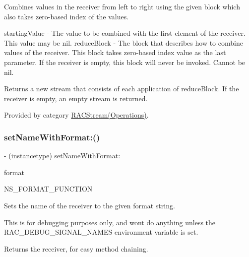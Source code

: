 Combines values in the receiver from left to right using the given block which also takes zero-\/based index of the values.

starting\+Value -\/ The value to be combined with the first element of the receiver. This value may be {\ttfamily nil}. reduce\+Block -\/ The block that describes how to combine values of the receiver. This block takes zero-\/based index value as the last parameter. If the receiver is empty, this block will never be invoked. Cannot be nil.

Returns a new stream that consists of each application of {\ttfamily reduce\+Block}. If the receiver is empty, an empty stream is returned. 

Provided by category \mbox{\hyperlink{category_r_a_c_stream_07_operations_08_a69cedeb6e96a6d4154f2256fdcbe27b1}{R\+A\+C\+Stream(\+Operations)}}.

\mbox{\label{interface_r_a_c_stream_aedc0b75ca3e6d0f81f006c7c3c6a1d76}} 
\subsubsection{\texorpdfstring{set\+Name\+With\+Format\+:()}{setNameWithFormat:()}\hspace{0.1cm}{\footnotesize\ttfamily [1/3]}}
{\footnotesize\ttfamily -\/ (instancetype) set\+Name\+With\+Format\+: \begin{DoxyParamCaption}\item[{(N\+S\+String $\ast$)}]{format }\item[{,(1)}]{ }\item[{(2)}]{N\+S\+\_\+\+F\+O\+R\+M\+A\+T\+\_\+\+F\+U\+N\+C\+T\+I\+ON }\end{DoxyParamCaption}\hspace{0.3cm}{\ttfamily [implementation]}}

Sets the name of the receiver to the given format string.

This is for debugging purposes only, and won\textquotesingle{}t do anything unless the R\+A\+C\+\_\+\+D\+E\+B\+U\+G\+\_\+\+S\+I\+G\+N\+A\+L\+\_\+\+N\+A\+M\+ES environment variable is set.

Returns the receiver, for easy method chaining. \mbox{\label{interface_r_a_c_stream_aedc0b75ca3e6d0f81f006c7c3c6a1d76}} 
